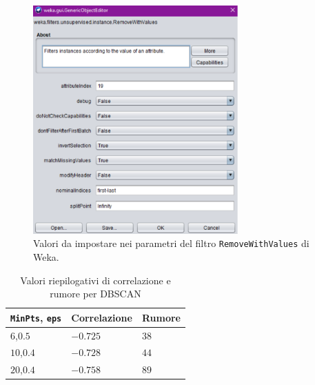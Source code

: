 \documentclass[12pt]{article}
\begin{document}
\begin{figure}[H]
\centering
	\includegraphics[width=0.7\textwidth]{img/filter-for-remove-noise.pdf}
	\caption{Valori da impostare nei parametri del filtro \texttt{RemoveWithValues} di Weka.}
	\label{fig:remove-noise}
\end{figure}

\begin{table}[H]
\centering
\begin{tabular}{@{}lll@{}}
\toprule	
\texttt{MinPts}, \texttt{eps} & Correlazione & Rumore \\ \hline
$6$,$0.5$       & $-0.725$  & $38$     \\ 
$10$,$0.4$      & $-0.728$  & $44$     \\ 
$20$,$0.4$      & $-0.758$  & $89$     \\ \bottomrule
\end{tabular}
\caption{Valori riepilogativi di correlazione e rumore per DBSCAN}
\label{tab:corr-noise-dbscan}
\end{table}
\end{document}
